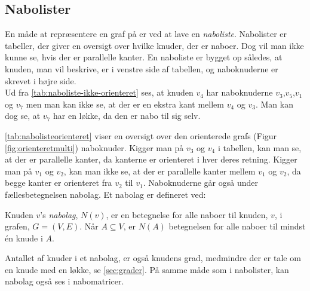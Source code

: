 \subsection{Nabolister}
En måde at repræsentere en graf på er ved at lave en \emph{naboliste}. Nabolister er tabeller, der giver en oversigt over hvilke knuder, der er naboer. Dog vil man ikke kunne se, hvis der er parallelle kanter. En naboliste er bygget op således, at knuden, man vil beskrive, er i venstre side af tabellen, og naboknuderne er skrevet i højre side. \\




Ud fra \autoref{tab:naboliste-ikke-orienteret} ses, at knuden $v_4$ har naboknuderne $v_3$,$v_5$,$v_1$ og $v_7$ men man kan ikke se, at der er en ekstra kant mellem $v_4$ og $v_3$. Man kan dog se, at $v_7$ har en løkke, da den er nabo til sig selv.


\autoref{tab:nabolisteorienteret} viser en oversigt over den orienterede grafs (Figur \ref{fig:orienteretmulti}) naboknuder. Kigger man på $v_3$ og $v_4$ i tabellen, kan man se, at der er parallelle kanter, da kanterne er orienteret i hver deres retning. Kigger man på $v_1$ og $v_2$, kan man ikke se, at der er parallelle kanter mellem $v_1$ og $v_2$, da begge kanter er orienteret fra $v_2$ til $v_1$. Naboknuderne går også under fællesbetegnelsen nabolag. Et nabolag er defineret ved:

\begin{defn}[Nabolag] \label{defn:nabolag}
Knuden $v$'s \emph{nabolag}, $N(v)$, er en betegnelse for alle naboer til knuden, $v$, i grafen, $G=(V,E)$. Når $A \subseteq V$, er $N(A)$ betegnelsen for alle naboer til mindst én knude i $A$.
\end{defn}

Antallet af knuder i et nabolag, er også knudens grad, medmindre der er tale om en knude med en løkke, se \autoref{sec:grader}. 
På samme måde som i nabolister, kan nabolag også ses i nabomatricer.